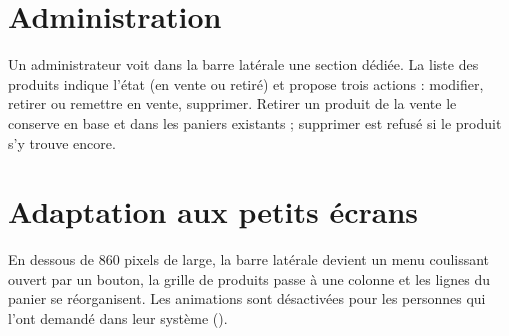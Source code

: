 \section{Administration}
Un administrateur voit dans la barre latérale une section dédiée. La liste des produits indique l'état (en vente ou retiré)
et propose trois actions : modifier, retirer ou remettre en vente, supprimer. Retirer un produit de la vente le conserve en base
et dans les paniers existants ; supprimer est refusé si le produit s'y trouve encore.


\section{Adaptation aux petits écrans}
En dessous de 860 pixels de large, la barre latérale devient un menu coulissant ouvert par un bouton, la grille de produits
passe à une colonne et les lignes du panier se réorganisent. Les animations sont désactivées pour les personnes qui
l'ont demandé dans leur système ().

